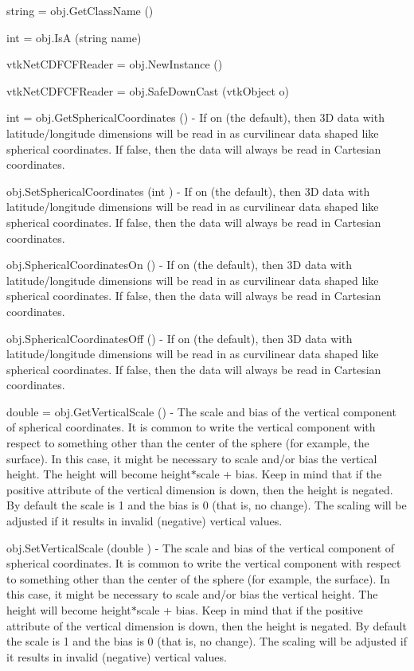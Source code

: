 \begin{DoxyItemize}
\item {\ttfamily string = obj.\-Get\-Class\-Name ()}  
\item {\ttfamily int = obj.\-Is\-A (string name)}  
\item {\ttfamily vtk\-Net\-C\-D\-F\-C\-F\-Reader = obj.\-New\-Instance ()}  
\item {\ttfamily vtk\-Net\-C\-D\-F\-C\-F\-Reader = obj.\-Safe\-Down\-Cast (vtk\-Object o)}  
\item {\ttfamily int = obj.\-Get\-Spherical\-Coordinates ()} -\/ If on (the default), then 3\-D data with latitude/longitude dimensions will be read in as curvilinear data shaped like spherical coordinates. If false, then the data will always be read in Cartesian coordinates.  
\item {\ttfamily obj.\-Set\-Spherical\-Coordinates (int )} -\/ If on (the default), then 3\-D data with latitude/longitude dimensions will be read in as curvilinear data shaped like spherical coordinates. If false, then the data will always be read in Cartesian coordinates.  
\item {\ttfamily obj.\-Spherical\-Coordinates\-On ()} -\/ If on (the default), then 3\-D data with latitude/longitude dimensions will be read in as curvilinear data shaped like spherical coordinates. If false, then the data will always be read in Cartesian coordinates.  
\item {\ttfamily obj.\-Spherical\-Coordinates\-Off ()} -\/ If on (the default), then 3\-D data with latitude/longitude dimensions will be read in as curvilinear data shaped like spherical coordinates. If false, then the data will always be read in Cartesian coordinates.  
\item {\ttfamily double = obj.\-Get\-Vertical\-Scale ()} -\/ The scale and bias of the vertical component of spherical coordinates. It is common to write the vertical component with respect to something other than the center of the sphere (for example, the surface). In this case, it might be necessary to scale and/or bias the vertical height. The height will become height$\ast$scale + bias. Keep in mind that if the positive attribute of the vertical dimension is down, then the height is negated. By default the scale is 1 and the bias is 0 (that is, no change). The scaling will be adjusted if it results in invalid (negative) vertical values.  
\item {\ttfamily obj.\-Set\-Vertical\-Scale (double )} -\/ The scale and bias of the vertical component of spherical coordinates. It is common to write the vertical component with respect to something other than the center of the sphere (for example, the surface). In this case, it might be necessary to scale and/or bias the vertical height. The height will become height$\ast$scale + bias. Keep in mind that if the positive attribute of the vertical dimension is down, then the height is negated. By default the scale is 1 and the bias is 0 (that is, no change). The scaling will be adjusted if it results in invalid (negative) vertical values.  

\end{DoxyItemize}
